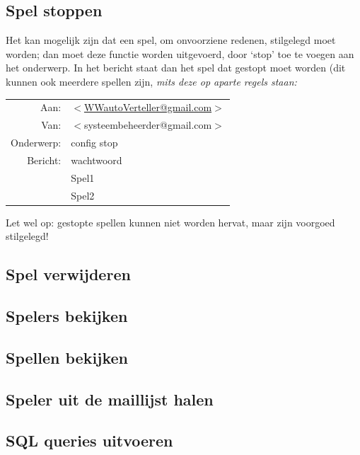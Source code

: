 \documentclass[12pt]{article}
\begin{document}
  \subsection{Spel stoppen}
  
    Het kan mogelijk zijn dat een spel, om onvoorziene redenen, stilgelegd moet worden; dan moet deze functie worden uitgevoerd, door `stop' toe te voegen aan het onderwerp. In het bericht staat dan het spel dat gestopt moet worden (dit kunnen ook meerdere spellen zijn, \emph{mits deze op aparte regels staan:}
    
    \begin{center}
      \begin{tabularx}{0.75\textwidth}[c]{|r X|}
	\hline
	Aan: & \href{mailto:<WWautoVerteller@gmail.com>}{$<$WWautoVerteller@gmail.com$>$} \\
	Van: & $<$systeembeheerder@gmail.com$>$ \\
	Onderwerp: & config stop \\[\baselineskip]	
	Bericht: & wachtwoord \\
	 & Spel1 \\
	 & Spel2 \\
	\hline
      \end{tabularx}
    \end{center}
    
    Let wel op: gestopte spellen kunnen niet worden hervat, maar zijn voorgoed stilgelegd!
  
  \subsection{Spel verwijderen}
  
  \subsection{Spelers bekijken}
  
  \subsection{Spellen bekijken}
  
  \subsection{Speler uit de maillijst halen}
  
  \subsection{SQL queries uitvoeren}
\end{document}
